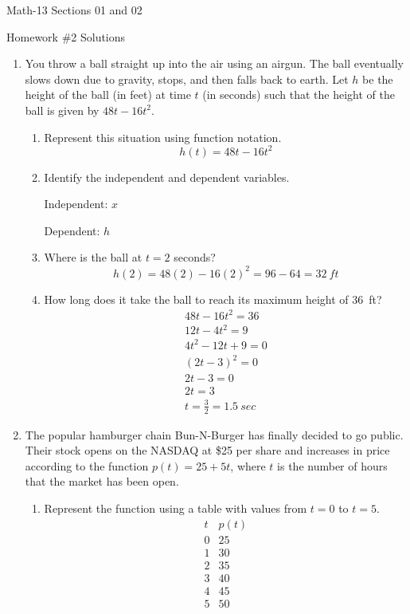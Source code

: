 \documentclass[letterpaper,12pt,fleqn]{article}
\begin{document}
\begin{center}
  \large
  Math-13 Sections 01 and 02

  \Large
  Homework \#2 Solutions
\end{center}

\begin{enumerate}
\item You throw a ball straight up into the air using an airgun.  The ball eventually slows down due to gravity,
  stops, and then falls back to earth.  Let \(h\) be the height of the ball (in feet) at time \(t\) (in seconds)
  such that the height of the ball is given by \(48t-16t^2\).
  \begin{enumerate}
  \item Represent this situation using function notation.
    \[h(t)=48t-16t^2\]
  \item Identify the independent and dependent variables.

    Independent: \(x\)

    Dependent: \(h\)

  \item Where is the ball at \(t=2\) seconds?
    \[h(2)=48(2)-16(2)^2=96-64=\SI{32}{ft}\]
  \item How long does it take the ball to reach its maximum height of \SI{36}{ft}?
    \begin{gather*}
      48t-16t^2=36 \\
      12t-4t^2=9 \\
      4t^2-12t+9=0 \\
      (2t-3)^2=0 \\
      2t-3=0 \\
      2t=3 \\
      t=\frac{3}{2}=\SI{1.5}{sec}
    \end{gather*}
  \end{enumerate}

\item The popular hamburger chain Bun-N-Burger has finally decided to go public.  Their stock opens on the NASDAQ
  at \$25 per share and increases in price according to the function \(p(t)=25+5t\), where \(t\) is the number of
  hours that the market has been open.
  \begin{enumerate}
  \item Represent the function using a table with values from \(t=0\) to \(t=5\).
    \[\begin{array}{c|c}
    t & p(t) \\
    \hline
    0 & 25 \\
    1 & 30 \\
    2 & 35 \\
    3 & 40 \\
    4 & 45 \\
    5 & 50
    \end{array}\]
    

\end{enumerate}
\end{enumerate}
\end{document}
